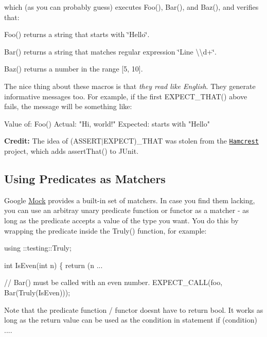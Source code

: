 which (as you can probably guess) executes {\ttfamily Foo()}, {\ttfamily Bar()}, and {\ttfamily Baz()}, and verifies that\+:


\begin{DoxyItemize}
\item {\ttfamily Foo()} returns a string that starts with {\ttfamily \char`\"{}\+Hello\char`\"{}}.
\item {\ttfamily Bar()} returns a string that matches regular expression {\ttfamily \char`\"{}\+Line \textbackslash{}\textbackslash{}d+\char`\"{}}.
\item {\ttfamily Baz()} returns a number in the range \mbox{[}5, 10\mbox{]}.
\end{DoxyItemize}

The nice thing about these macros is that {\itshape they read like English}. They generate informative messages too. For example, if the first {\ttfamily E\+X\+P\+E\+C\+T\+\_\+\+T\+H\+A\+T()} above fails, the message will be something like\+:


\begin{DoxyCode}
Value of: Foo()
  Actual: "Hi, world!"
Expected: starts with "Hello"
\end{DoxyCode}


{\bfseries Credit\+:} The idea of {\ttfamily (A\+S\+S\+E\+R\+T$\vert$\+E\+X\+P\+E\+CT)\+\_\+\+T\+H\+AT} was stolen from the \href{http://code.google.com/p/hamcrest/}{\tt Hamcrest} project, which adds {\ttfamily assert\+That()} to J\+Unit.

\subsection*{Using Predicates as Matchers}

Google \hyperlink{class_mock}{Mock} provides a built-\/in set of matchers. In case you find them lacking, you can use an arbitray unary predicate function or functor as a matcher -\/ as long as the predicate accepts a value of the type you want. You do this by wrapping the predicate inside the {\ttfamily Truly()} function, for example\+:


\begin{DoxyCode}
using ::testing::Truly;

int IsEven(int n) \{ return (n %
...

  // Bar() must be called with an even number.
  EXPECT\_CALL(foo, Bar(Truly(IsEven)));
\end{DoxyCode}


Note that the predicate function / functor doesn\textquotesingle{}t have to return {\ttfamily bool}. It works as long as the return value can be used as the condition in statement {\ttfamily if (condition) ...}.

